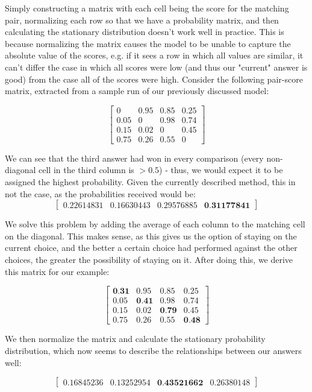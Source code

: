 \documentclass{article}
\begin{document}
Simply constructing a matrix with each cell being the score for the matching pair, normalizing each row so that we have a probability matrix, and then calculating the stationary distribution doesn't work well in practice. This is because normalizing the matrix causes the model to be unable to capture the absolute value of the scores, e.g. if it sees a row in which all values are similar, it can't differ the case in which all scores were low (and thus our "current" answer is good) from the case all of the scores were high.
Consider the following pair-score matrix, extracted from a sample run of our previously discussed model:

$$
\begin{bmatrix}
0 & 0.95 & 0.85 & 0.25 \\
0.05 & 0 & 0.98 & 0.74 \\
0.15 & 0.02 & 0 & 0.45 \\
0.75 & 0.26 & 0.55 & 0
\end{bmatrix}
$$

We can see that the third answer had won in every comparison (every non-diagonal cell in the third column is $>0.5$) - thus, we would expect it to be assigned the highest probability. Given the currently described method, this in not the case, as the probabilities received would be:
$$ \begin{bmatrix} 0.22614831 & 0.16630443 & 0.29576885 & \textbf{0.31177841} \end{bmatrix} $$

We solve this problem by adding the average of each column to the matching cell on the diagonal. This makes sense, as this gives us the option of staying on the current choice, and the better a certain choice had performed against the other choices, the greater the possibility of staying on it.
After doing this, we derive this matrix for our example:

$$
\begin{bmatrix}
\textbf{0.31} & 0.95 & 0.85 & 0.25 \\
0.05 & \textbf{0.41} & 0.98 & 0.74 \\
0.15 & 0.02 & \textbf{0.79} & 0.45 \\
0.75 & 0.26 & 0.55 & \textbf{0.48}
\end{bmatrix}
$$

We then normalize the matrix and calculate the stationary probability distribution, which now seems to describe the relationships between our answers well:

$$ \begin{bmatrix} 0.16845236 & 0.13252954 & \textbf{0.43521662} & 0.26380148 \end{bmatrix} $$
\end{document}
